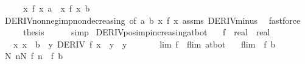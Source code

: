 \begin{isabellebody}
%
\isatagproof
{}\isamarkupfalse%
\ {\isacharminus}{\kern0pt}\isanewline
\ \ \isamarkupfalse%
\ {\isachardoublequoteopen}{\isacharparenleft}{\kern0pt}{\isasymlambda}x{\isachardot}{\kern0pt}\ {\isacharminus}{\kern0pt}f\ x{\isacharparenright}{\kern0pt}\ a\ {\isasymle}\ {\isacharparenleft}{\kern0pt}{\isasymlambda}x{\isachardot}{\kern0pt}\ {\isacharminus}{\kern0pt}f\ x{\isacharparenright}{\kern0pt}\ b{\isachardoublequoteclose}\isanewline
\ \ \ \ \isamarkupfalse%
\ DERIV{\isacharunderscore}{\kern0pt}nonneg{\isacharunderscore}{\kern0pt}imp{\isacharunderscore}{\kern0pt}nondecreasing\ {\isacharbrackleft}{\kern0pt}of\ a\ b\ {\isachardoublequoteopen}{\isasymlambda}x{\isachardot}{\kern0pt}\ {\isacharminus}{\kern0pt}f\ x{\isachardoublequoteclose}{\isacharbrackright}{\kern0pt}\ assms\ DERIV{\isacharunderscore}{\kern0pt}minus\ \isamarkupfalse%
\ fastforce\isanewline
\ \ \isamarkupfalse%
\ \isamarkupfalse%
\ {\isacharquery}{\kern0pt}thesis\isanewline
\ \ \ \ \isamarkupfalse%
\ simp\isanewline
{}\isamarkupfalse%
%
\endisatagproof
{\isafoldproof}%
%
\isadelimproof
\isanewline
%
\endisadelimproof
\isanewline
{}\isamarkupfalse%
\ DERIV{\isacharunderscore}{\kern0pt}pos{\isacharunderscore}{\kern0pt}imp{\isacharunderscore}{\kern0pt}increasing{\isacharunderscore}{\kern0pt}at{\isacharunderscore}{\kern0pt}bot{\isacharcolon}{\kern0pt}\isanewline
\ \ \ f\ {\isacharcolon}{\kern0pt}{\isacharcolon}{\kern0pt}\ {\isachardoublequoteopen}real\ {\isasymRightarrow}\ real{\isachardoublequoteclose}\isanewline
\ \ \ {\isachardoublequoteopen}{\isasymAnd}x{\isachardot}{\kern0pt}\ x\ {\isasymle}\ b\ {\isasymLongrightarrow}\ {\isacharparenleft}{\kern0pt}{\isasymexists}y{\isachardot}{\kern0pt}\ DERIV\ f\ x\ {\isacharcolon}{\kern0pt}{\isachargreater}{\kern0pt}\ y\ {\isasymand}\ y\ {\isachargreater}{\kern0pt}\ {}{\isacharparenright}{\kern0pt}{\isachardoublequoteclose}\isanewline
\ \ \ \ \ lim{\isacharcolon}{\kern0pt}\ {\isachardoublequoteopen}{\isacharparenleft}{\kern0pt}f\ {\isasymlonglongrightarrow}\ flim{\isacharparenright}{\kern0pt}\ at{\isacharunderscore}{\kern0pt}bot{\isachardoublequoteclose}\isanewline
\ \ \ {\isachardoublequoteopen}flim\ {\isacharless}{\kern0pt}\ f\ b{\isachardoublequoteclose}\isanewline
%
\isadelimproof
%
\endisadelimproof
%
\isatagproof
{}\isamarkupfalse%
\ {\isacharminus}{\kern0pt}\isanewline
\ \ \isamarkupfalse%
\ {\isachardoublequoteopen}{\isasymexists}N{\isachardot}{\kern0pt}\ {\isasymforall}n{\isasymle}N{\isachardot}{\kern0pt}\ f\ n\ {\isasymle}\ f\ {\isacharparenleft}{\kern0pt}b\ {\isacharminus}{\kern0pt}\ {}{\isacharparenright}{\kern0pt}{\isachardoublequoteclose}\isanewline

\end{isabellebody}
